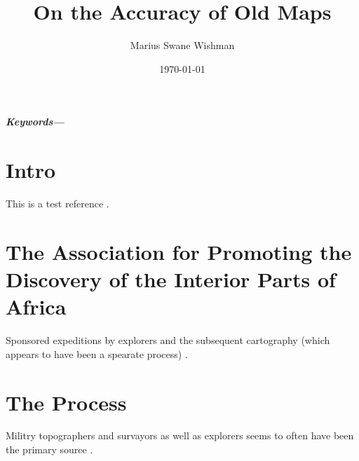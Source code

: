 \documentclass[12pt]{article}
\title{On the Accuracy of Old Maps}
\author[1]{Marius Swane Wishman}
\affil[1]{Department of Sociology and Political Science, NTNU}
\date{\today}
\providecommand{\keywords}[1]
{
	\small	
	\textbf{\textit{Keywords---}} #1
}
\begin{document}
\maketitle

\begin{abstract}
\end{abstract}

\keywords{}

\pagebreak


\onehalfspacing

\section{Intro}

This is a test reference \citep{Alesina2011}.

\section{The Association for Promoting the Discovery of the Interior Parts of
Africa}

Sponsored expeditions by explorers and the subsequent cartography (which appears
to have been a spearate process) \citep{Bassett_1994}.

\section{The Process}

Militry topographers and survayors as well as explorers seems to often have been
the primary source \citep{Bassett_1994}.

\section{}

\pagebreak


{}
\end{document}
